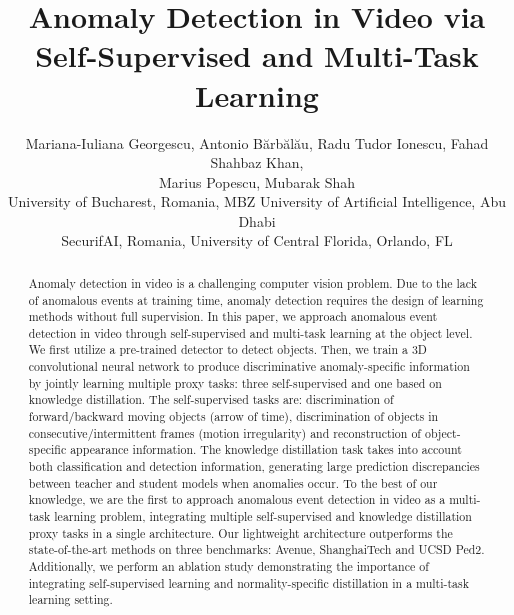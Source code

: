 \documentclass[final]{cvpr}
\begin{document}
\title{Anomaly Detection in Video via Self-Supervised and Multi-Task Learning}

\author{Mariana-Iuliana Georgescu, Antonio B\u{a}rb\u{a}l\u{a}u, Radu Tudor Ionescu, Fahad Shahbaz Khan,\\
Marius Popescu, Mubarak Shah\\
University of Bucharest, Romania, MBZ University of Artificial Intelligence, Abu Dhabi\\
SecurifAI, Romania, University of Central Florida, Orlando, FL\vspace*{-0.3cm}
}

\maketitle


\begin{abstract}
\vspace{-0.1cm}
Anomaly detection in video is a challenging computer vision problem. Due to the lack of anomalous events at training time, anomaly detection requires the design of learning methods without full supervision. In this paper, we approach anomalous event detection in video through self-supervised and multi-task learning at the object level. We first utilize a pre-trained detector to detect objects. Then, we train a 3D convolutional neural network to produce discriminative anomaly-specific information by jointly learning multiple proxy tasks: three self-supervised and one based on knowledge distillation. The self-supervised tasks are:  discrimination of forward/backward moving objects (arrow of time),  discrimination of objects in consecutive/intermittent frames (motion irregularity) and  reconstruction of object-specific appearance information. The knowledge distillation task takes into account both classification and detection information, generating large prediction discrepancies between teacher and student models when anomalies occur. To the best of our knowledge, we are the first to approach anomalous event detection in video as a multi-task learning problem, integrating multiple self-supervised and knowledge distillation proxy tasks in a single architecture. Our lightweight architecture outperforms the state-of-the-art methods on three benchmarks: Avenue, ShanghaiTech and UCSD Ped2. Additionally, we perform an ablation study demonstrating the importance of integrating self-supervised learning and normality-specific distillation in a multi-task learning setting.
\vspace{-0.1cm}
\end{abstract}
\end{document}
